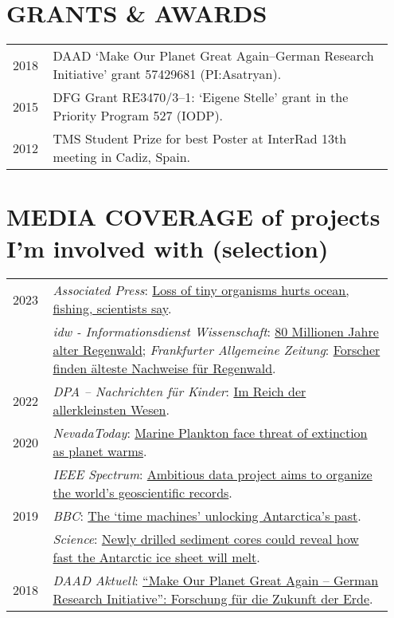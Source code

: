 \documentclass[11pt, a4paper]{article}
\begin{document}
\section{GRANTS \& AWARDS}
\begin{longtable}{@{}p{0.1\linewidth} >{\small}P{0.85\linewidth}@{}}
2018 & DAAD `Make Our Planet Great Again--German Research Initiative' grant 57429681 (PI:Asatryan).\\
2015 & DFG Grant RE3470/3--1: `Eigene Stelle' grant in the Priority Program 527 (IODP).\\
2012 & TMS Student Prize for best Poster at InterRad 13th meeting in Cadiz, Spain.\\
\end{longtable}

\section[MEDIA COVERAGE]{MEDIA COVERAGE \textnormal{\footnotesize{ of projects I'm involved with (selection)}}}
\begin{longtable}{@{}p{0.1\linewidth} >{\small}P{0.85\linewidth}@{}}
2023 & \emph{Associated Press}: \href{https://apnews.com/article/science-maine-business-plants-fish-be8b6bd671dfb968f68ca6adecb69d7f}{Loss of tiny organisms hurts ocean, fishing, scientists say}.\\
    & \emph{idw - Informationsdienst Wissenschaft}: \href{http://n.idwf.de/811551}{80 Millionen Jahre alter Regenwald}; \emph{Frankfurter Allgemeine Zeitung}: \href{https://www.faz.net/-gzh-b6mjs}{Forscher finden älteste Nachweise für Regenwald}.\\
2022 & \emph{DPA -- Nachrichten für Kinder}: \href{https://www.aachener-zeitung.de/karlo-clever/im-reich-der-allerkleinsten-wesen_aid-73918737}{Im Reich der allerkleinsten Wesen}.\\
2020 & \emph{NevadaToday}: \href{https://www.unr.edu/nevada-today/news/2020/marine-plankton}{Marine Plankton face threat of extinction as planet warms}.\\
    & \emph{IEEE Spectrum}: \href{https://spectrum.ieee.org/computing/software/ambitious-data-project-aims-to-organize-the-worlds-geoscientific-records}{Ambitious data project aims to organize the world’s geoscientific records}.\\
2019 & \emph{BBC}: \href{https://www.bbc.com/reel/video/p07bvx51/the-time-machines-unlocking-antarctica-s-past}{The `time machines' unlocking Antarctica's past}.\\
    & \emph{Science}: \href{http://dx.doi.org/10.1126/science.aax7040}{Newly drilled sediment cores could reveal how fast the Antarctic ice sheet will melt}.\\
2018 & \emph{DAAD Aktuell}: \href{https://www.daad.de/der-daad/daad-aktuell/de/66800-make-our-planet-great-again-german-research-initiative-forschung-fuer-die-zukunft-der-erde/}{``Make Our Planet Great Again -- German Research Initiative'': Forschung für die Zukunft der Erde}.\\
\end{longtable}
\end{document}
